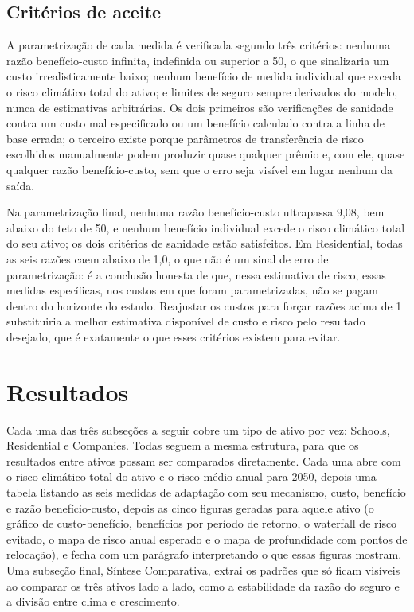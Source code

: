 \documentclass[11pt]{article}
\begin{document}
\subsection{Critérios de aceite}
\label{sec:refinamento}

A parametrização de cada medida é verificada segundo três critérios: nenhuma razão
benefício-custo infinita, indefinida ou superior a 50, o que sinalizaria um custo
irrealisticamente baixo; nenhum benefício de medida individual que exceda o risco
climático total do ativo; e limites de seguro sempre derivados do modelo, nunca de
estimativas arbitrárias. Os dois primeiros são verificações de sanidade contra um custo mal
especificado ou um benefício calculado contra a linha de base errada; o terceiro existe
porque parâmetros de transferência de risco escolhidos manualmente podem produzir quase
qualquer prêmio e, com ele, quase qualquer razão benefício-custo, sem que o erro seja
visível em lugar nenhum da saída.

Na parametrização final, nenhuma razão benefício-custo ultrapassa 9,08, bem abaixo do teto
de 50, e nenhum benefício individual excede o risco climático total do seu ativo; os dois
critérios de sanidade estão satisfeitos. Em Residential, todas as seis razões caem abaixo
de 1,0, o que não é um sinal de erro de parametrização: é a conclusão honesta de que, nessa
estimativa de risco, essas medidas específicas, nos custos em que foram parametrizadas, não
se pagam dentro do horizonte do estudo. Reajustar os custos para forçar razões acima de 1
substituiria a melhor estimativa disponível de custo e risco pelo resultado desejado, que é
exatamente o que esses critérios existem para evitar.

\section{Resultados}
\label{sec:resultados}

Cada uma das três subseções a seguir cobre um tipo de ativo por vez: Schools, Residential
e Companies. Todas seguem a mesma estrutura, para que os resultados entre ativos possam
ser comparados diretamente. Cada uma abre com o risco climático total do ativo e o risco
médio anual para 2050, depois uma tabela listando as seis medidas de adaptação com seu
mecanismo, custo, benefício e razão benefício-custo, depois as cinco figuras geradas para
aquele ativo (o gráfico de custo-benefício, benefícios por período de retorno, o waterfall
de risco evitado, o mapa de risco anual esperado e o mapa de profundidade com pontos de
relocação), e fecha com um parágrafo interpretando o que essas figuras mostram. Uma
subseção final, Síntese Comparativa, extrai os padrões que só ficam visíveis ao comparar
os três ativos lado a lado, como a estabilidade da razão do seguro e a divisão entre clima
e crescimento.
\end{document}
